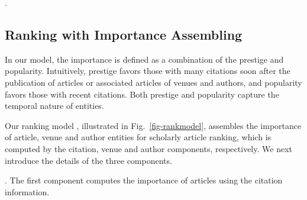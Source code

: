 
\vspace{-1ex}
.


\subsection{Ranking with Importance Assembling}
\label{subsec-ensemble}


In our model, the importance is defined as a combination of the prestige and popularity. Intuitively, prestige favors those with many citations soon after the publication of articles or associated articles of venues and authors, and popularity favors those with recent citations. Both prestige and popularity capture the temporal nature of entities. %

Our ranking model \ensemblerank,  illustrated in Fig.~\ref{fig-rankmodel}, assembles the importance of article, venue and author entities for scholarly article ranking, which is computed by the citation, venue and author components, respectively.
%
We next introduce the details of the three components.


.
The first component computes the importance of articles using the citation information.

